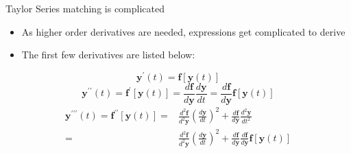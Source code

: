 \documentclass[serif]{beamer}
\begin{document}
\begin{frame}{Taylor Series matching is complicated}
  \begin{itemize}
  \item<1-> As higher order derivatives are needed, expressions get complicated to derive
  \item<1-> The first few derivatives are listed below:
  \end{itemize}
  \begin{equation}
    \nonumber
    \mathbf{y}^\prime\left(t\right) = \mathbf{f}\left[\mathbf{y}\left(t\right)\right]
  \end{equation}
  \begin{equation}
    \nonumber
    \mathbf{y}^{\prime\prime}\left(t\right) = \mathbf{f}^\prime\left[\mathbf{y}\left(t\right)\right]=\frac{d\mathbf{f}}{d\mathbf{y}}\frac{d\mathbf{y}}{dt} = \frac{d\mathbf{f}}{d\mathbf{y}}\mathbf{f}\left[\mathbf{y}\left(t\right)\right]
  \end{equation}
  \begin{align*}
    \mathbf{y}^{\prime\prime\prime}\left(t\right) = \mathbf{f}^{\prime\prime}\left[\mathbf{y}\left(t\right)\right]= & \frac{d^2\mathbf{f}}{d^2\mathbf{y}}\left(\frac{d\mathbf{y}}{dt}\right)^2 + \frac{d\mathbf{f}}{d\mathbf{y}} \frac{d^2\mathbf{y}}{dt^2} \\
    = & \frac{d^2\mathbf{f}}{d^2\mathbf{y}}\left(\frac{d\mathbf{y}}{dt}\right)^2 + \frac{d\mathbf{f}}{d\mathbf{y}} \frac{d\mathbf{f}}{d\mathbf{y}}\mathbf{f}\left[\mathbf{y}\left(t\right)\right]
  \end{align*}
\end{frame}
\end{document}

